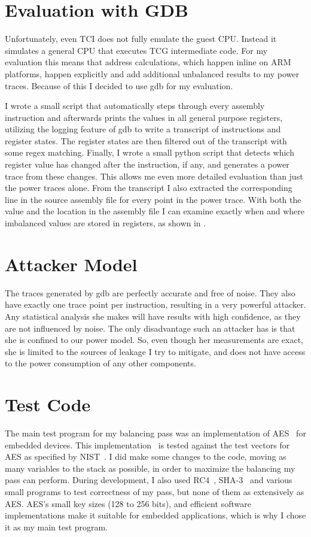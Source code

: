 \section{Evaluation with GDB}
Unfortunately, even TCI does not fully emulate the guest CPU.
Instead it simulates a general CPU that executes TCG intermediate code.
For my evaluation this means that address calculations, which happen inline on ARM platforms, happen explicitly and add additional unbalanced results to my power traces.
Because of this I decided to use gdb for my evaluation.

I wrote a small script that automatically steps through every assembly instruction and afterwards prints the values in all general purpose registers, utilizing the logging feature of gdb to write a transcript of instructions and register states.
The register states are then filtered out of the transcript with some regex matching.
Finally, I wrote a small python script that detects which register value has changed after the instruction, if any, and generates a power trace from these changes.
This allows me even more detailed evaluation than just the power traces alone.
From the transcript I also extracted the corresponding line in the source assembly file for every point in the power trace.
With both the value and the location in the assembly file I can examine exactly when and where imbalanced values are stored in registers, as shown in .

\section{Attacker Model}
The traces generated by gdb are perfectly accurate and free of noise.
They also have exactly one trace point per instruction, resulting in a very powerful attacker.
Any statistical analysis she makes will have results with high confidence, as they are not influenced by noise.
The only disadvantage such an attacker has is that she is confined to our power model.
So, even though her measurements are exact, she is limited to the sources of leakage I try to mitigate, and does not have access to the power consumption of any other components.

\section{Test Code}
The main test program for my balancing pass was an implementation of AES~\cite{daemen2013design} for embedded devices.
This implementation~\cite{tinyaes} is tested against the test vectors for AES as specified by NIST~\cite{dworkin2001recommendation}.
I did make some changes to the code, moving as many variables to the stack as possible, in order to maximize the balancing my pass can perform.
During development, I also used RC4~\cite{rc4}, SHA-3~\cite{bertoni2013keccak} and various small programs to test correctness of my pass, but none of them as extensively as AES.
AES's small key sizes (128 to 256 bits), and efficient software implementations make it suitable for embedded applications, which is why I chose it as my main test program.

